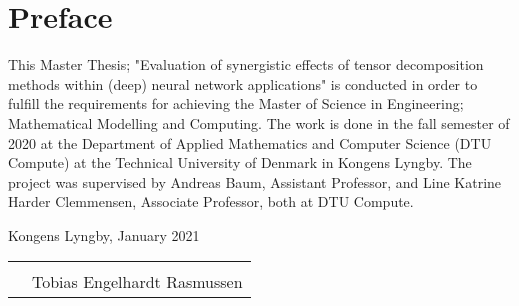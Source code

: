 \section{Preface}

\noindent This Master Thesis; "Evaluation of synergistic effects of tensor decomposition methods within (deep) neural network applications" is conducted in order to fulfill the requirements for achieving the Master of Science in Engineering; Mathematical Modelling and Computing. The work is done in the fall semester of 2020 at the Department of Applied Mathematics and Computer Science (DTU Compute) at the Technical University of Denmark in Kongens Lyngby. The project was supervised by Andreas Baum, Assistant Professor, and Line Katrine Harder Clemmensen, Associate Professor, both at DTU Compute.

\vspace{4cm}
\begin{flushright}
Kongens Lyngby, January 2021 \\
\vspace{2cm}

\begin{tabular}{ll}
         &                   \\ \hline
         &                    \\
 & Tobias Engelhardt Rasmussen
\end{tabular}

\end{flushright}

